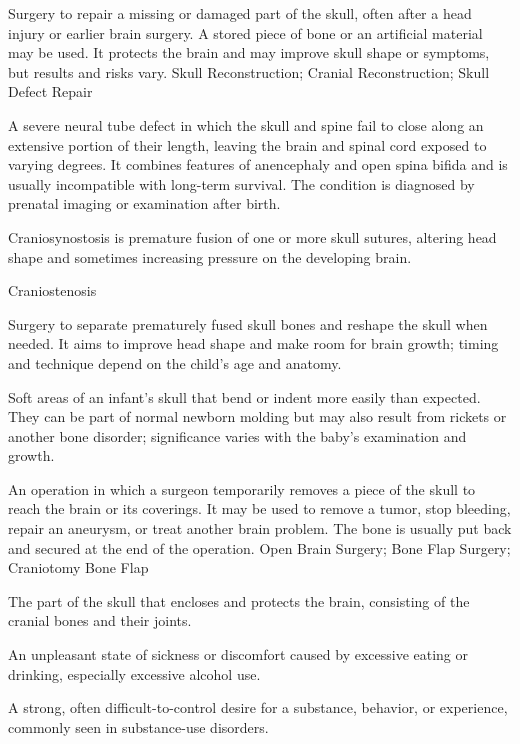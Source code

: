  Surgery to repair a missing or damaged part of the skull, often after a head injury or earlier brain surgery. A stored piece of bone or an artificial material may be used. It protects the brain and may improve skull shape or symptoms, but results and risks vary.
\synonyms
Skull Reconstruction; Cranial Reconstruction; Skull Defect Repair

 A severe neural tube defect in which the skull and spine fail to close
along an extensive portion of their length, leaving the brain and spinal cord exposed to varying
degrees. It combines features of anencephaly and open spina bifida and is usually incompatible with
long-term survival. The condition is diagnosed by prenatal imaging or examination after birth.

 Craniosynostosis is premature fusion of one or more skull sutures, altering head shape and sometimes increasing pressure on the developing brain.

\synonyms
Craniostenosis

 Surgery to separate prematurely fused skull bones and reshape the skull when needed. It aims to improve head shape and make room for brain growth; timing and technique depend on the child's age and anatomy.

 Soft areas of an infant's skull that bend or indent more easily than expected. They can be part of normal newborn molding but may also result from rickets or another bone disorder; significance varies with the baby's examination and growth.

 An operation in which a surgeon temporarily removes a piece of the skull to reach the brain or its coverings. It may be used to remove a tumor, stop bleeding, repair an aneurysm, or treat another brain problem. The bone is usually put back and secured at the end of the operation.
\synonyms
Open Brain Surgery; Bone Flap Surgery; Craniotomy Bone Flap

 The part of the skull that encloses and protects the brain, consisting of the cranial bones and their joints.

 An unpleasant state of sickness or discomfort caused by excessive eating or drinking, especially excessive alcohol use.

 A strong, often difficult-to-control desire for a substance, behavior, or experience, commonly seen in substance-use disorders.

